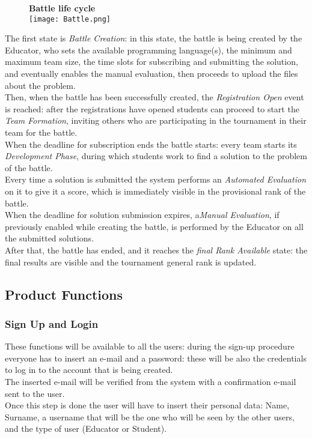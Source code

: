 \documentclass{article}
\begin{document}
\begin{figure}[H]
    \centering
    \textbf{Battle life cycle} \\
    \texttt{[image: Battle.png]}
\end{figure}
\noindent
The first state is \textit{Battle Creation}: in this state, the battle is being created by the Educator, who sets the available programming language(s), the minimum and maximum team size, the time slots for subscribing and submitting the solution, and eventually enables the manual evaluation, then proceeds to upload the files about the problem.\\
Then, when the battle has been successfully created, the \textit{Registration Open} event is reached: after the registrations have opened students can proceed to start the \textit{Team Formation}, inviting others who are participating in the tournament in their team for the battle.\\
When the deadline for subscription ends the battle starts: every team starts its \textit{Development Phase}, during which students work to find a solution to the problem of the battle.\\
Every time a solution is submitted the system performs an \textit{Automated Evaluation} on it to give it a score, which is immediately visible in the provisional rank of the battle.\\
When the deadline for solution submission expires, a\textit{Manual Evaluation}, if previously enabled while creating the battle, is performed by the Educator on all the submitted solutions.\\
After that, the battle has ended, and it reaches the \textit{final Rank Available} state: the final results are visible and the tournament general rank is updated.\\
\subsection{Product Functions}

\subsubsection{Sign Up and Login}
These functions will be available to all the users: during the sign-up procedure everyone has to insert an e-mail and a password: these will be also the credentials to log in to the account that is being created.\\
The inserted e-mail will be verified from the system with a confirmation e-mail sent to the user.\\
Once this step is done the user will have to insert their personal data: Name, Surname, a username that will be the one who will be seen by the other users, and the type of user (Educator or Student).
\end{document}
